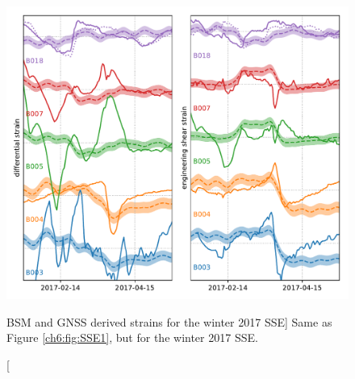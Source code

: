\begin{figure}
\includegraphics{ch6/figures/SSE7.pdf}
\caption
[BSM and GNSS derived strains for the winter 2017 SSE]
{Same as Figure \ref{ch6:fig:SSE1}, but for the winter 2017 SSE.}   
\label{ch6:fig:SSE7}
\end{figure}

%
%  
